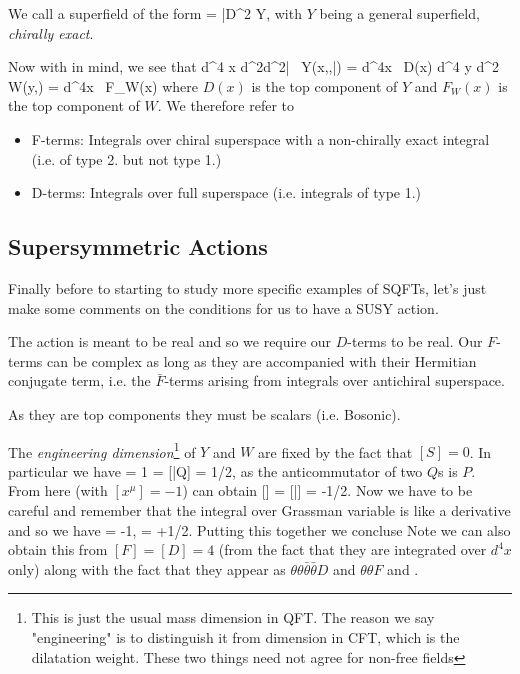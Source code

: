     We call a superfield of the form 
    \be 
    \label{eqn:ChirallyExact}
        \chi = \bar{D}^2 Y,
    \ee 
    with $Y$ being a general superfield, \textit{chirally exact}. 
\ed 

Now with  in mind, we see that 
\bse 
    \int d^4 x d^2\theta d^2\bar{\theta} \, Y(x,\theta,\bar{\theta}) = \int d^4x \, D(x) \qand \int d^4 y d^2\theta \, W(y,\theta) = \int d^4x \, F_W(x)
\ese
where $D(x)$ is the top component of $Y$ and $F_W(x)$ is the top component of $W$. We therefore refer to 
\begin{itemize}
    \item F-terms: Integrals over chiral superspace with a non-chirally exact integral (i.e. of type 2. but not type 1.)
    \item D-terms: Integrals over full superspace (i.e. integrals of type 1.)
\end{itemize}

\subsection{Supersymmetric Actions}

Finally before to starting to study more specific examples of SQFTs, let's just make some comments on the conditions for us to have a SUSY action. 
\ben[label=(\roman*)]
    \item The action is meant to be real and so we require our $D$-terms to be real. Our $F$-terms can be complex as long as they are accompanied with their Hermitian conjugate term, i.e. the $\bar{F}$-terms arising from integrals over antichiral superspace.
    \item As they are top components they must be scalars (i.e. Bosonic). 
    \item The \textit{engineering dimension}\footnote{This is just the usual mass dimension in QFT. The reason we say "engineering" is to distinguish it from dimension in CFT, which is the dilatation weight. These two things need not agree for non-free fields} of $Y$ and $W$ are fixed by the fact that $[S]=0$. In particular we have 
    \bse 
        [P_{\mu}] = 1 \quad \implies \quad [Q] = [\bar{Q}] = 1/2,
    \ese 
    as the anticommutator of two $Q$s is $P$. From here (with $[x^{\mu}]=-1$) can obtain 
    \be 
    \label{eqn:ThetaDimension}
        [\theta] = [\bar{\theta}] = -1/2.
    \ee 
    Now we have to be careful and remember that the integral over Grassman variable is like a derivative and so we have 
    \bse 
         = -1, \qquad {} \qquad {} = +1/2.
    \ese 
    Putting this together we concluse
    Note we can also obtain this from $[F]=[D]=4$ (from the fact that they are integrated over $d^4x$ only) along with the fact that they appear as $\theta\theta\bar{\theta}\bar{\theta}D$ and $\theta\theta F$ and . 
\een 